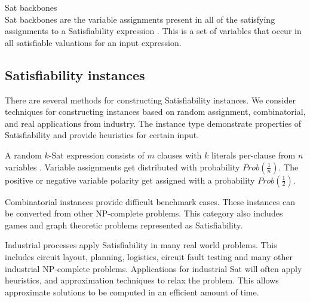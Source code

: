 \begin{definition}
{\sc Sat} backbones\\
{\sc Sat} backbones are the variable assignments present in all of the satisfying assignments to a {\sc Satisfiability} expression \cite{Zhang2001}.  This is a set of variables that occur in all satisfiable valuations for an input expression.  

\end{definition}



	\subsection{{\sc Satisfiability} instances}
		
There are several methods for constructing {\sc Satisfiability} instances.  We consider techniques for constructing instances based on random assignment, combinatorial, and real applications from industry.  The instance type demonstrate properties of {\sc Satisfiability} and provide heuristics for certain input.
	
A random $k$-{\sc Sat} expression consists of $m$ clauses with $k$ literals per-clause from  $n$ variables \cite{wilsonKsat}. Variable assignments get distributed with probability $Prob\left(\frac{1}{n}\right)$.  The positive or negative variable polarity get assigned with a probability $Prob\left(\frac{1}{2}\right)$.


		

Combinatorial instances provide difficult benchmark cases.  These instances can be converted from other \textsf{NP-complete} problems.  This category also includes games and graph theoretic problems represented as {\sc Satisfiability}. 
		
		

Industrial processes apply {\sc Satisfiability} in many real world problems.  This includes circuit layout, planning, logistics, circuit fault testing and many other industrial \textsf{NP-complete} problems.  Applications for industrial {\sc Sat} will often apply heuristics, and approximation techniques to relax the problem.  This allows approximate solutions to be computed in an efficient amount of time.
		